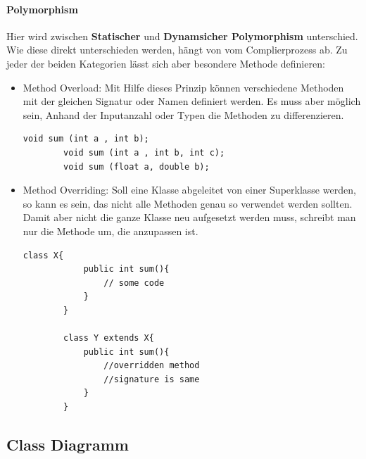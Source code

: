 \paragraph{Polymorphism}
Hier wird zwischen \textbf{Statischer} und \textbf{Dynamsicher Polymorphism} unterschied. Wie diese direkt unterschieden werden, hängt von vom Complierprozess ab. Zu jeder der beiden Kategorien lässt sich aber besondere Methode definieren:
\begin{itemize}
	\item Method Overload: Mit Hilfe dieses Prinzip können verschiedene Methoden mit der gleichen Signatur oder Namen definiert werden. Es muss aber möglich sein, Anhand der Inputanzahl oder Typen die Methoden zu differenzieren. 
	\begin{lstlisting}[style=C++]
		void sum (int a , int b);
		void sum (int a , int b, int c);
		void sum (float a, double b);
	\end{lstlisting}
	\item Method Overriding: Soll eine Klasse abgeleitet von einer Superklasse werden, so kann es sein, das nicht alle Methoden genau so verwendet werden sollten. Damit aber nicht die ganze Klasse neu aufgesetzt werden muss, schreibt man nur die Methode um, die anzupassen ist.
	\begin{lstlisting}[style=C++]
		class X{
			public int sum(){
				// some code
			}
		}
		
		class Y extends X{
			public int sum(){
				//overridden method
				//signature is same
			}
		}
	\end{lstlisting}
\end{itemize}
\subsection{Class Diagramm}
